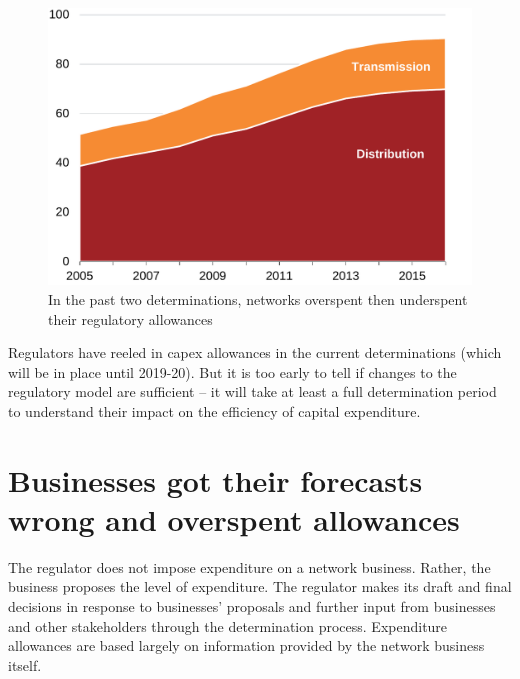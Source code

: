 \documentclass[FrontPage]{grattan}
\begin{document}
\begin{figure}
\caption{In the past two determinations, networks overspent then underspent their regulatory allowances}\label{fig:overspend-by-determination-period}
\includegraphics[page=28]{atlas/Charts.pdf}
\end{figure}

Regulators have reeled in capex allowances in the current determinations (which will be in place until 2019-20). But it is too early to tell if changes to the regulatory model are sufficient -- it will take at least a full determination period to understand their impact on the efficiency of capital expenditure.


\section{Businesses got their forecasts wrong and overspent allowances}\label{sec:businesses-got-forecasts-wrong-and-overspent}
The regulator does not impose expenditure on a network business. Rather, the business proposes the level of expenditure. The regulator makes its draft and final decisions in response to businesses' proposals and further input from businesses and other stakeholders through the determination process. Expenditure allowances are based largely on information provided by the network business itself.
\end{document}
